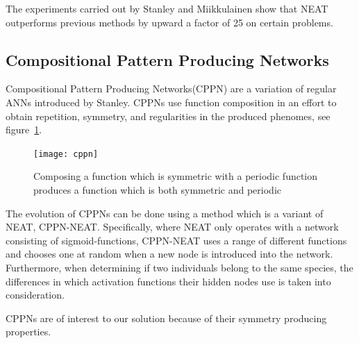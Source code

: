 The experiments carried out by Stanley and Miikkulainen show that NEAT 
outperforms previous methods by upward a factor of 
25 on certain problems\cite[p.~2]{stanley2002evolving}.
\subsection{Compositional Pattern Producing Networks}
\label{sec:cppn}
Compositional Pattern Producing Networks(CPPN) are a variation of regular ANNs 
introduced by 
Stanley\cite{Stanley2007}.
CPPNs use function composition in an effort to obtain repetition, symmetry, and 
regularities in the produced phenomes, see figure~\ref{fig:cppn}.
\begin{figure}[ht]
\centering
\texttt{[image: cppn]}
\caption{Composing a function which is symmetric with a periodic function 
produces a function which is both symmetric and periodic \cite{Stanley2007}}
\label{fig:cppn}
\end{figure}

The evolution of CPPNs can be done using a method which is a variant of NEAT, 
CPPN-NEAT.
Specifically, where NEAT only operates with a network consisting of 
sigmoid-functions, CPPN-NEAT uses a range of different functions and chooses 
one at random when a new node is introduced into the network.
Furthermore, when determining if two individuals belong to the same species, 
the differences in which activation functions their hidden nodes use is taken 
into consideration.

CPPNs are of interest to our solution because of their symmetry producing 
properties.


